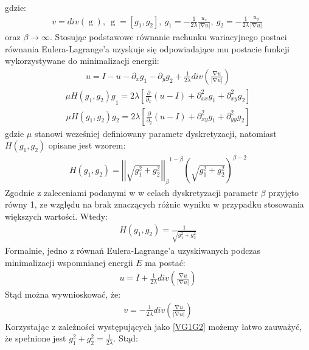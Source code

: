 \documentclass[12pt, twoside, openany]{report}
\theoremstyle{definition}
\begin{document}
gdzie:
\begin{align}
v=div\left(\mathop{g}\right),\ \mathop{g}=\left[g_1,g_2\right],\ g_1=-\frac{1}{2\lambda }\frac{u_x}{\left|\mathrm{\nabla }u\right|},\ g_2=-\frac{1}{2\lambda }\frac{u_y}{\left|\mathrm{\nabla }u\right|}\
\label{VG1G2}
\end{align}
oraz $\beta \to \mathrm{\infty }$. Stosując podstawowe równanie rachunku wariacyjnego postaci równania Eulera-Lagrange'a uzyskuje się odpowiadające mu postacie funkcji wykorzystywane do minimalizacji energii:
\begin{align}
u=I-u-{\partial }_xg_1-{\partial }_yg_2+\frac{1}{2\lambda }div\left(\frac{\mathrm{\nabla }u}{\left|\mathrm{\nabla }u\right|}\right)
\end{align}
\begin{align}
{\mu H\left(g_1,g_2\right)g}_1=2\lambda \left[\frac{\partial }{{\partial }_x}\left(u-I\right)+{\partial }^2_{xx}g_1+{\partial }^2_{xy}g_2\right]
\end{align}
\begin{align}
\mu H\left(g_1,g_2\right)g_2=2\lambda \left[\frac{\partial }{{\partial }_y}\left(u-I\right)+{\partial }^2_{xy}g_1+{\partial }^2_{yy}g_2\right]
\end{align}
gdzie $\mu$ stanowi wcześniej definiowany parametr dyskretyzacji, natomiast $H\left(g_1,g_2\right)$ opisane jest wzorem:
\begin{align}
H\left(g_1,g_2\right)={{{\left|\left|\sqrt{g^2_1+g^2_2}\right|\right|}_\beta}^{1-\beta}}{\left(\sqrt{g^2_1+g^2_2}\right)}^{\beta-2}
\end{align}
Zgodnie z zaleceniami podanymi w \cite{vese2003modeling} w celach dyskretyzacji parametr $\beta$ przyjęto równy 1, ze względu na brak znaczących różnic wyniku w przypadku stosowania większych wartości. Wtedy:
\begin{align}
H\left(g_1,g_2\right)=\frac{1}{\sqrt{g^2_1+g^2_2}}
\end{align}
Formalnie, jedno z równań Eulera-Lagrange'a uzyskiwanych podczas minimalizacji wspomnianej energii $E$ ma postać:
\begin{align}
u=I+\frac{1}{2\lambda }div\left(\frac{\mathrm{\nabla }u}{\left|\mathrm{\nabla }u\right|}\right)
\end{align}
Stąd można wywnioskować, że:
\begin{align}
v=-\frac{1}{2\lambda }div\left(\frac{\mathrm{\nabla }u}{\left|\mathrm{\nabla }u\right|}\right)
\end{align}
Korzystając z zależności występujących jako \eqref{VG1G2} możemy łatwo zauważyć, że spełnione jest $g^2_1+g^2_2=\frac{1}{2\lambda }$. Stąd:
\end{document}
